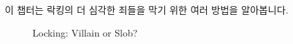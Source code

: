 이 챕터는 락킹의 더 심각한 죄들을 막기 위한 여러 방법을 알아봅니다.

\begin{figure}[tb]
\centering
{}
\caption{Locking: Villain or Slob?}
\end{figure}

